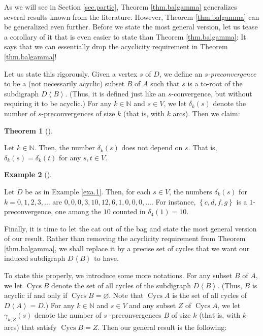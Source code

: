 \documentclass[numbers=enddot,12pt,final,onecolumn,notitlepage]{scrartcl}%
\theoremstyle{definition}
\newtheorem{theo}{Theorem}[section]
\newenvironment{theorem}[1][]
{\begin{theo}[#1]\begin{leftbar}}
{\end{leftbar}\end{theo}}
\newtheorem{exam}[theo]{Example}
\newenvironment{example}[1][]
{\begin{exam}[#1]\begin{leftbar}}
{\end{leftbar}\end{exam}}
\theoremstyle{plainsl}
\begin{document}
As we will see in Section \ref{sec.partic}, Theorem \ref{thm.balgamma}
generalizes several results known from the literature. However, Theorem
\ref{thm.balgamma} can be generalized even further. Before we state the most
general version, let us tease a corollary of it that is even easier to state
than Theorem \ref{thm.balgamma}: It says that we can essentially drop the
acyclicity requirement in Theorem \ref{thm.balgamma}!

Let us state this rigorously. Given a vertex $s$ of $D$, we define an
\emph{$s$-preconvergence} to be a (not necessarily acyclic) subset $B$ of $A$
such that $s$ is a to-root of the subdigraph $D\left\langle B\right\rangle $.
(Thus, it is defined just like an $s$-convergence, but without requiring it to
be acyclic.) For any $k\in\mathbb{N}$ and $s\in V$, we let $\delta_{k}\left(
s\right)  $ denote the number of $s$-preconvergences of size $k$ (that is,
with $k$ arcs). Then we claim:

\begin{theorem}
\label{thm.baldelta}Let $k\in\mathbb{N}$. Then, the number $\delta_{k}\left(
s\right)  $ does not depend on $s$. That is, $\delta_{k}\left(  s\right)
=\delta_{k}\left(  t\right)  $ for any $s,t\in V$.
\end{theorem}

\begin{example}
\label{exa.1del}Let $D$ be as in Example \ref{exa.1}. Then, for each $s\in V$,
the numbers $\delta_{k}\left(  s\right)  $ for $k=0,1,2,3,\ldots$ are
$0,0,0,3,10,12,6,1,0,0,0,\ldots$. For instance, $\left\{  c,d,f,g\right\}  $
is a $1$-preconvergence, one among the $10$ counted in $\delta_{4}\left(
1\right)  =10$.
\end{example}

Finally, it is time to let the cat out of the bag and state the most general
version of our result. Rather than removing the acyclicity requirement from
Theorem \ref{thm.balgamma}, we shall replace it by a precise set of cycles
that we want our induced subdigraph $D\left\langle B\right\rangle $ to have.

To state this properly, we introduce some more notations. For any subset $B$
of $A$, we let $\operatorname*{Cycs}B$ denote the set of all cycles of the
subdigraph $D\left\langle B\right\rangle $. (Thus, $B$ is acyclic if and only
if $\operatorname*{Cycs}B=\varnothing$. Note that $\operatorname*{Cycs}A$ is
the set of all cycles of $D\left\langle A\right\rangle =D$.) For any
$k\in\mathbb{N}$ and $s\in V$ and any subset $Z$ of $\operatorname*{Cycs}A$,
we let $\gamma_{k,Z}\left(  s\right)  $ denote the number of $s$%
-preconvergences $B$ of size $k$ (that is, with $k$ arcs) that satisfy
$\operatorname*{Cycs}B=Z$. Then our general result is the following:
\end{document}
